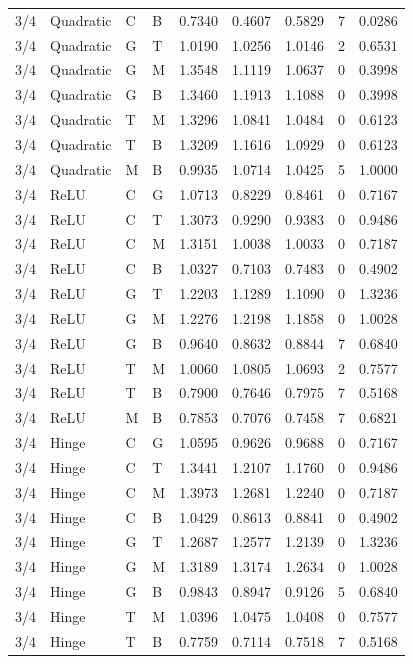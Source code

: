 \begin{longtable}{llllrrrrr}
3/4 & Quadratic & C & B & 0.7340 & 0.4607 & 0.5829 & 7 & 0.0286 \\
3/4 & Quadratic & G & T & 1.0190 & 1.0256 & 1.0146 & 2 & 0.6531 \\
3/4 & Quadratic & G & M & 1.3548 & 1.1119 & 1.0637 & 0 & 0.3998 \\
3/4 & Quadratic & G & B & 1.3460 & 1.1913 & 1.1088 & 0 & 0.3998 \\
3/4 & Quadratic & T & M & 1.3296 & 1.0841 & 1.0484 & 0 & 0.6123 \\
3/4 & Quadratic & T & B & 1.3209 & 1.1616 & 1.0929 & 0 & 0.6123 \\
3/4 & Quadratic & M & B & 0.9935 & 1.0714 & 1.0425 & 5 & 1.0000 \\
3/4 & ReLU & C & G & 1.0713 & 0.8229 & 0.8461 & 0 & 0.7167 \\
3/4 & ReLU & C & T & 1.3073 & 0.9290 & 0.9383 & 0 & 0.9486 \\
3/4 & ReLU & C & M & 1.3151 & 1.0038 & 1.0033 & 0 & 0.7187 \\
3/4 & ReLU & C & B & 1.0327 & 0.7103 & 0.7483 & 0 & 0.4902 \\
3/4 & ReLU & G & T & 1.2203 & 1.1289 & 1.1090 & 0 & 1.3236 \\
3/4 & ReLU & G & M & 1.2276 & 1.2198 & 1.1858 & 0 & 1.0028 \\
3/4 & ReLU & G & B & 0.9640 & 0.8632 & 0.8844 & 7 & 0.6840 \\
3/4 & ReLU & T & M & 1.0060 & 1.0805 & 1.0693 & 2 & 0.7577 \\
3/4 & ReLU & T & B & 0.7900 & 0.7646 & 0.7975 & 7 & 0.5168 \\
3/4 & ReLU & M & B & 0.7853 & 0.7076 & 0.7458 & 7 & 0.6821 \\
3/4 & Hinge & C & G & 1.0595 & 0.9626 & 0.9688 & 0 & 0.7167 \\
3/4 & Hinge & C & T & 1.3441 & 1.2107 & 1.1760 & 0 & 0.9486 \\
3/4 & Hinge & C & M & 1.3973 & 1.2681 & 1.2240 & 0 & 0.7187 \\
3/4 & Hinge & C & B & 1.0429 & 0.8613 & 0.8841 & 0 & 0.4902 \\
3/4 & Hinge & G & T & 1.2687 & 1.2577 & 1.2139 & 0 & 1.3236 \\
3/4 & Hinge & G & M & 1.3189 & 1.3174 & 1.2634 & 0 & 1.0028 \\
3/4 & Hinge & G & B & 0.9843 & 0.8947 & 0.9126 & 5 & 0.6840 \\
3/4 & Hinge & T & M & 1.0396 & 1.0475 & 1.0408 & 0 & 0.7577 \\
3/4 & Hinge & T & B & 0.7759 & 0.7114 & 0.7518 & 7 & 0.5168 \\

\end{longtable}
